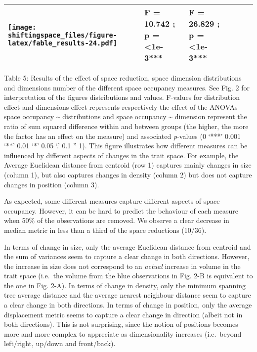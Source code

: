 \documentclass[]{article}
\begin{document}
\begin{longtable}[]{@{}llllll@{}}
\begin{minipage}[t]{0.13\columnwidth}
\texttt{[image: shiftingspace\_files/figure-latex/fable\_results-24.pdf]}\strut
\end{minipage} & \begin{minipage}[t]{0.17\columnwidth}\raggedright\strut
F = 10.742 ; p = \textless{}1e-3***\strut
\end{minipage} & \begin{minipage}[t]{0.16\columnwidth}\raggedright\strut
F = 26.829 ; p = \textless{}1e-3***\strut
\end{minipage}\tabularnewline
\bottomrule
\end{longtable}

Table 5: Results of the effect of space reduction, space dimension
distributions and dimensions number of the different space occupancy
measures. See Fig. 2 for interpretation of the figures distributions and
values. F-values for distribution effect and dimensions effect
represents respectively the effect of the ANOVAs space occupancy
\textasciitilde{} distributions and space occupancy \textasciitilde{}
dimension represent the ratio of sum squared difference within and
between groups (the higher, the more the factor has an effect on the
measure) and associated \emph{p}-values (0 `***' 0.001 `**' 0.01 `*'
0.05 `.' 0.1 '' 1). This figure illustrates how different measures can
be influenced by different aspects of changes in the trait space. For
example, the Average Euclidean distance from centroid (row 1) captures
mainly changes in size (column 1), but also captures changes in density
(column 2) but does not capture changes in position (column 3).

As expected, some different measures capture different aspects of space
occupancy. However, it can be hard to predict the behaviour of each
measure when 50\% of the observations are removed. We observe a clear
decrease in median metric in less than a third of the space reductions
(10/36).

In terms of change in size, only the average Euclidean distance from
centroid and the sum of variances seem to capture a clear change in both
directions. However, the increase in size does not correspond to an
\emph{actual} increase in volume in the trait space (i.e.~the volume
from the blue observations in Fig. 2-B is equivalent to the one in Fig.
2-A). In terms of change in density, only the minimum spanning tree
average distance and the average nearest neighbour distance seem to
capture a clear change in both directions. In terms of change in
position, only the average displacement metric seems to capture a clear
change in direction (albeit not in both directions). This is not
surprising, since the notion of positions becomes more and more complex
to appreciate as dimensionality increases (i.e.~beyond left/right,
up/down and front/back).
\end{document}

